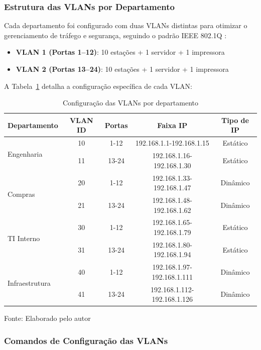 \subsubsection{Estrutura das VLANs por Departamento}

Cada departamento foi configurado com duas VLANs distintas para otimizar o gerenciamento de tráfego e segurança, seguindo o padrão IEEE 802.1Q \cite{ieee8021q}:

\begin{itemize}
    \item \textbf{VLAN 1 (Portas 1--12)}: 10 estações + 1 servidor + 1 impressora
    \item \textbf{VLAN 2 (Portas 13--24)}: 10 estações + 1 servidor + 1 impressora
\end{itemize}

A Tabela~\ref{tab:vlans_configuracao} detalha a configuração específica de cada VLAN:

\begin{table}[H]
\centering
\caption{Configuração das VLANs por departamento}
\begin{tabular}{|l|c|c|c|c|}
\hline
\textbf{Departamento} & \textbf{VLAN ID} & \textbf{Portas} & \textbf{Faixa IP} & \textbf{Tipo de IP} \\
\hline
\multirow{2}{*}{Engenharia} & 10 & 1-12 & 192.168.1.1-192.168.1.15 & Estático \\
\cline{2-5}
& 11 & 13-24 & 192.168.1.16-192.168.1.30 & Estático \\
\hline
\multirow{2}{*}{Compras} & 20 & 1-12 & 192.168.1.33-192.168.1.47 & Dinâmico \\
\cline{2-5}
& 21 & 13-24 & 192.168.1.48-192.168.1.62 & Dinâmico \\
\hline
\multirow{2}{*}{TI Interno} & 30 & 1-12 & 192.168.1.65-192.168.1.79 & Estático \\
\cline{2-5}
& 31 & 13-24 & 192.168.1.80-192.168.1.94 & Estático \\
\hline
\multirow{2}{*}{Infraestrutura} & 40 & 1-12 & 192.168.1.97-192.168.1.111 & Dinâmico \\
\cline{2-5}
& 41 & 13-24 & 192.168.1.112-192.168.1.126 & Dinâmico \\
\hline
\end{tabular}
\label{tab:vlans_configuracao}
{\fontsize{10pt}{\baselineskip}\selectfont
Fonte: Elaborado pelo autor}
\end{table}

\subsubsection{Comandos de Configuração das VLANs}


